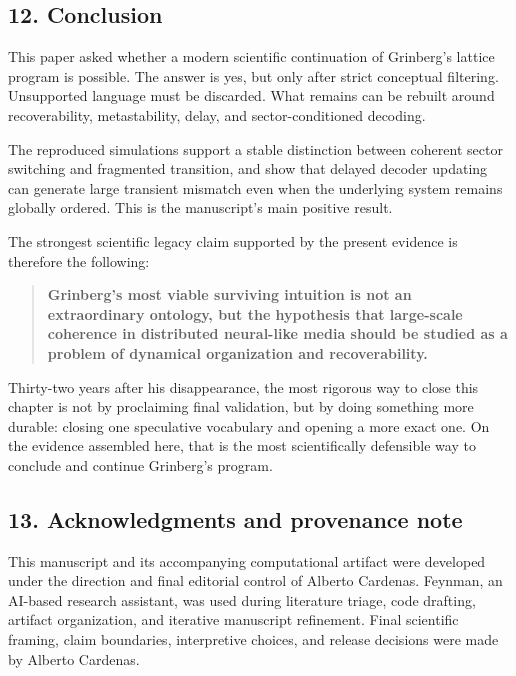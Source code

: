 \documentclass[
]{article}
\begin{document}
\subsection{12. Conclusion}\label{conclusion}

This paper asked whether a modern scientific continuation of Grinberg's
lattice program is possible. The answer is yes, but only after strict
conceptual filtering. Unsupported language must be discarded. What
remains can be rebuilt around recoverability, metastability, delay, and
sector-conditioned decoding.

The reproduced simulations support a stable distinction between coherent
sector switching and fragmented transition, and show that delayed
decoder updating can generate large transient mismatch even when the
underlying system remains globally ordered. This is the manuscript's
main positive result.

The strongest scientific legacy claim supported by the present evidence
is therefore the following:

\begin{quote}
\textbf{Grinberg's most viable surviving intuition is not an
extraordinary ontology, but the hypothesis that large-scale coherence in
distributed neural-like media should be studied as a problem of
dynamical organization and recoverability.}
\end{quote}

Thirty-two years after his disappearance, the most rigorous way to close
this chapter is not by proclaiming final validation, but by doing
something more durable: closing one speculative vocabulary and opening a
more exact one. On the evidence assembled here, that is the most
scientifically defensible way to conclude and continue Grinberg's
program.

\subsection{13. Acknowledgments and provenance
note}\label{acknowledgments-and-provenance-note}

This manuscript and its accompanying computational artifact were
developed under the direction and final editorial control of Alberto
Cardenas. Feynman, an AI-based research assistant, was used during
literature triage, code drafting, artifact organization, and iterative
manuscript refinement. Final scientific framing, claim boundaries,
interpretive choices, and release decisions were made by Alberto
Cardenas.
\end{document}
